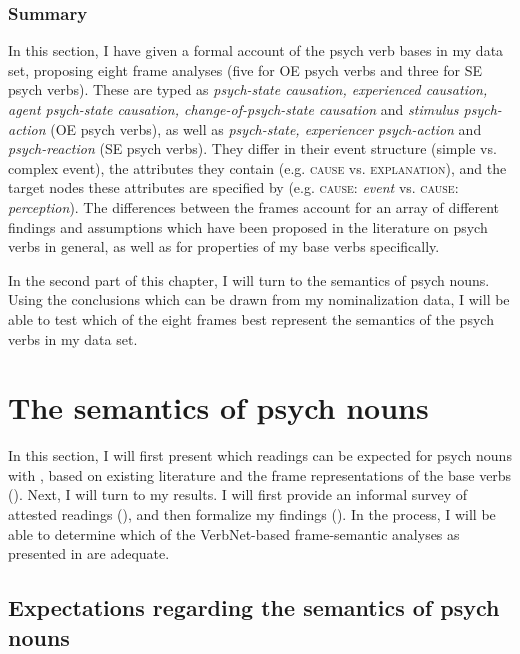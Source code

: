 \subsubsection{Summary}
In this section, I have given a formal account of the psych verb bases in my data set, proposing eight frame analyses (five for OE psych verbs and three for SE psych verbs). These are typed as \textit{psych-state causation, experienced causation, agent psych-state causation, change-of-psych-state causation} and \textit{stimulus psych-action} (OE psych verbs), as well as \textit{psych-state, experiencer psych-action} and \textit{psych-reaction} (SE psych verbs). 
They differ in 
their event structure (simple vs. complex event),
the attributes they contain (e.g. \textsc{cause} vs. \textsc{explanation}),
and the target nodes these attributes are specified by (e.g. \textsc{cause:} \textit{event} vs. \textsc{cause:} \textit{perception}).
The differences between the frames account for an array of different findings and assumptions which have been proposed in the literature on psych verbs in general, as well as for properties of my base verbs specifically.

In the second part of this chapter, I will turn to the semantics of psych nouns. Using the conclusions which can be drawn from my nominalization data, I will be able to test which of the eight frames best represent the semantics of the psych verbs in my data set.

\section{The semantics of psych nouns}
\label{sec:psy-output}

In this section, I will first present which readings can be expected for psych nouns with \ment{}, based on existing literature and the frame representations of the base verbs (). 
Next, I will turn to my results. I will first provide an informal survey of attested readings (), and then formalize my findings (). 
In the process, I will be able to determine which of the VerbNet-based frame-semantic analyses as presented in  are adequate.

\subsection{Expectations regarding the semantics of psych nouns}
\label{sec:psy-output-predictions}
